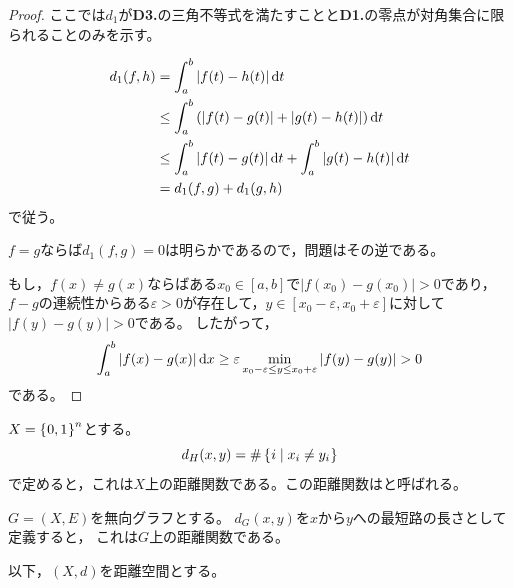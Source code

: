 \documentclass[uplatex]{jsarticle}
\begin{document}
\begin{proof}
    ここでは$d_{1}$が{\bf D3.}の三角不等式を満たすことと{\bf D1.}の零点が対角集合に限られることのみを示す。

    \begin{align*}
        d_{1} (f,h)
        &= \int_{a}^{b} \left| f(t) - h(t) \right| \mathrm{d}t \\
      &\le \int_{a}^{b} \left( \left| f(t) - g(t) \right| + \left| g(t) - h(t) \right| \right) \mathrm{d}t \\
      &\le \int_{a}^{b} \left| f(t) - g(t) \right| \mathrm{d}t +  \int_{a}^{b} \left| g(t) - h(t) \right| \mathrm{d}t \\
        &= d_{1} (f,g) + d_{1} (g,h)
    \end{align*}
    で従う。


    $f = g$ならば$d_{1} (f,g) = 0$は明らかであるので，問題はその逆である。

    もし，$f(x) \neq g(x)$ならばある$x_{0} \in [a,b]$で$\left| f(x_{0}) - g(x_{0}) \right|> 0$であり，
    $f-g$の連続性からある$\varepsilon > 0$が存在して，$y \in [x_{0} - \varepsilon, x_{0} + \varepsilon]$に対して
    $\left| f(y) - g(y) \right| > 0$である。
    したがって，
    \begin{equation*}
        \int_{a}^{b} \left| f(x) - g(x) \right| \mathrm{d}x \ge \varepsilon \min_{x_{0} - \varepsilon \le y \le x_{0} + \varepsilon} \left| f(y) - g(y) \right| > 0
    \end{equation*}
    である。
\end{proof}

\begin{rei}
    $X = \Set{\hspace{-1.8pt} 0,1 \hspace{-1.8pt}}^{n}$とする。
    \begin{equation}
        d_{H}(x,y) = \# \Set{\hspace{-1.8pt} i | x_{i} \neq y_{i} \hspace{-1.8pt}}
    \end{equation}
    で定めると，これは$X$上の距離関数である。この距離関数はと呼ばれる。
\end{rei}


\begin{rei}
    $G = (X,E)$を無向グラフとする。
    $d_{G}(x,y)$を$x$から$y$への最短路の長さとして定義すると，
    これは$G$上の距離関数である。
\end{rei}

以下，$(X,d)$を距離空間とする。
\end{document}
